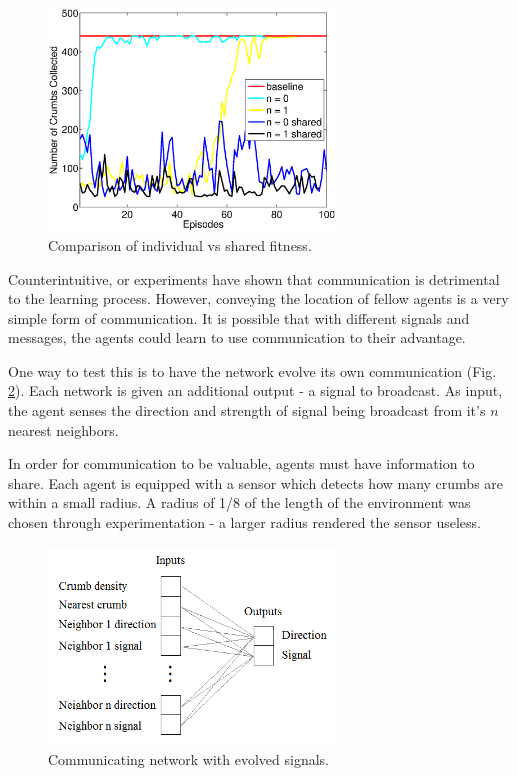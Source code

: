 \documentclass[conference]{IEEEtran}
\begin{document}
\begin{figure}[t]
\centering
\includegraphics[width=3.0in]{./figures/neroevolution/shared_result.eps}
\caption{Comparison of individual vs shared fitness.}
\label{neroevolution:shared_fitness}
\end{figure}


Counterintuitive, or experiments have shown that communication is detrimental to the learning process.
However, conveying the location of fellow agents is a very simple form of communication. It is possible that with different signals and messages, the agents could learn to use communication to their advantage.

One way to test this is to have the network evolve its own communication (Fig. \ref{neroevolution:evolved_comunication}). Each network is given an additional output - a signal to broadcast. As input, the agent senses the direction and strength of signal being broadcast from it's $n$ nearest neighbors. 

In order for communication to be valuable, agents must have information to share. 
Each agent is equipped with a sensor which detects how many crumbs are within a small radius. A radius of 1/8 of the length of the environment was chosen through experimentation - a larger radius rendered the sensor useless.

\begin{figure}[t]
\centering
\includegraphics[width=3.0in]{./figures/neroevolution/emerg_comm_network.png}
\caption{Communicating network with evolved signals.}
\label{neroevolution:evolved_comunication}
\end{figure}
\end{document}
